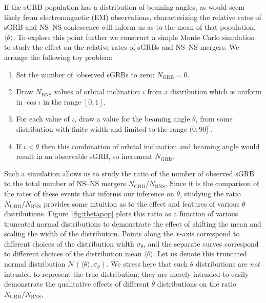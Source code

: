 \documentclass[twocolumn,nofootinbib]{revtex4-1}
\newcommand{\BNS}{\ac{NS}--\ac{NS}\xspace}
\def\electro#1{electromagnetic#1 (EM#1)\gdef\electro{EM}}
\begin{document}
If the \ac{sGRB} population has a distribution of beaming angles, as
would seem likely from \electro{} observations, characterizing the
relative rates of \ac{sGRB} and \BNS coalescence will inform us as to
the mean of that population, $\langle \theta \rangle$.  To explore
this point further we construct a simple Monte Carlo simulation to
study the effect on the relative rates of \acp{sGRB} and \BNS mergers.
We arrange the following toy problem:
%
\begin{enumerate}
    \item Set the number of `observed \acp{sGRB} to zero: $N_{\mathrm{GRB}}=0$.
    \item Draw $N_{\mathrm{BNS}}$ values of orbital inclination $\iota$ from a distribution which is uniform in $\cos \iota$ in the range $[0,1]$.
    \item For each value of $\iota$, draw a value for the beaming angle $\theta$, from some distribution with finite width and limited to the range $(0,90]^{\circ}$.
    \item If $\iota<\theta$ then this combination of orbital inclination and beaming angle would result in an observable \ac{sGRB}, so increment $N_{\mathrm{GRB}}$.
\end{enumerate}
%
Such a simulation allows us to study the ratio of the number of
observed \ac{sGRB} to the total number of \BNS mergers
$N_{\mathrm{GRB}}/N_{\mathrm{BNS}}$.  Since it is the comparison of
the rates of these events that informs our inference on $\theta$,
studying the ratio $N_{\mathrm{GRB}}/N_{\mathrm{BNS}}$ provides some
intuition as to the effect and features of various $\theta$
distributions.  Figure~\ref{fig:thetapop} plots this ratio as a
function of various truncated normal distributions to demonstrate the
effect of shifting the mean and scaling the width of the distribution.
Points along the $x$-axis correspond to different choices of the
distribution width $\sigma_{\theta}$, and the separate curves
correspond to different choices of the distribution mean
$\langle \theta \rangle$.  Let us denote this truncated normal
distribution ${\mathcal N}(\langle \theta \rangle, \sigma_{\theta})$.
We stress here that such $\theta$ distributions are \emph{not}
intended to represent the true distribution; they are merely intended
to easily demonstrate the qualitative effects of different $\theta$
distributions on the ratio $N_{\mathrm{GRB}}/N_{\mathrm{BNS}}$.
\end{document}
